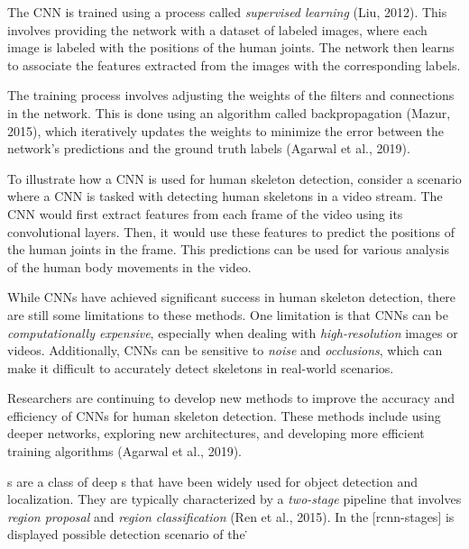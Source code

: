 
The CNN is trained using a process called {\em supervised learning} (\scc Liu, 2012). This involves providing the network with a dataset of labeled images, where each image is labeled with the positions of the human joints. The network then learns to associate the features extracted from the images with the corresponding labels.

The training process involves adjusting the weights of the filters and connections in the network. This is done using an algorithm called backpropagation (\scc Mazur, 2015), which iteratively updates the weights to minimize the error between the network's predictions and the ground truth labels (\scc Agarwal et al., 2019).


To illustrate how a CNN is used for human skeleton detection, consider a scenario where a CNN is tasked with detecting human skeletons in a video stream. The CNN would first extract features from each frame of the video using its convolutional layers. Then, it would use these features to predict the positions of the human joints in the frame. This predictions can be used for various analysis of the human body movements in the video.


While CNNs have achieved significant success in human skeleton detection, there are still some limitations to these methods. One limitation is that CNNs can be {\em computationally expensive}, especially when dealing with {\em high-resolution} images or videos. Additionally, CNNs can be sensitive to {\em noise} and {\em occlusions}, which can make it difficult to accurately detect skeletons in real-world scenarios.

Researchers are continuing to develop new methods to improve the accuracy and efficiency of CNNs for human skeleton detection. These methods include using deeper networks, exploring new architectures, and developing more efficient training algorithms (\scc Agarwal et al., 2019).

\RCNN\-s are a class of deep \CNN\-s that have been widely used for object detection and localization. They are typically characterized by a {\em two-stage} pipeline that involves {\em region proposal} and {\em region classification} (\scc Ren et al., 2015). In the [rcnn-stages] is displayed possible detection scenario of the \RCNN\.


